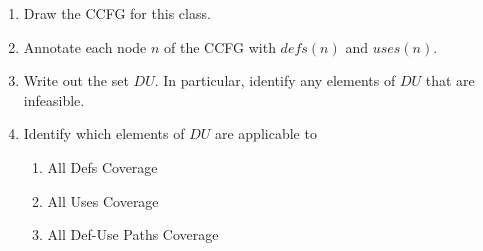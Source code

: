 \begin{enumerate}
            \begin{enumerate}
    
                \item Draw the CCFG for this class.
                
                \item Annotate each node $n$ of the CCFG with $\mathit{defs}(n)$ and 
                $\mathit{uses}(n)$.
    
                \item Write out the set $\mathit{DU}$. In particular, identify any
                elements of $\mathit{DU}$ that are infeasible.
                
                \item Identify which elements of $\mathit{DU}$ are applicable to 
                
                \begin{enumerate}
                    \item All Defs Coverage
                    \item All Uses Coverage
                    \item All Def-Use Paths Coverage
                \end{enumerate}            
                
            \end{enumerate}        
        
\end{enumerate}

